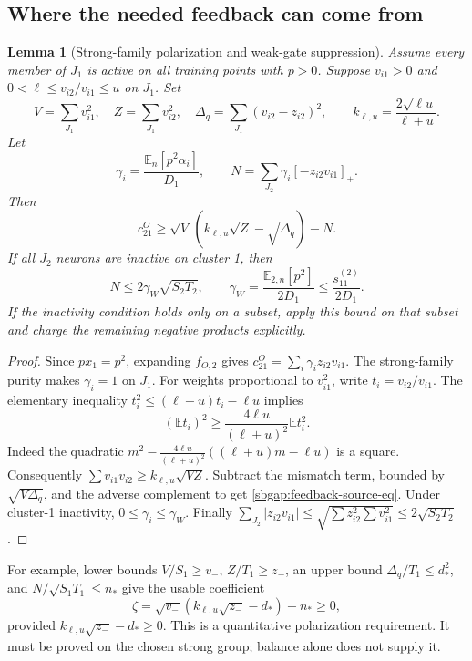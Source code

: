 \documentclass{article} %
\theoremstyle{plain}
\newtheorem{lemma}[theorem]{Lemma}
\theoremstyle{definition}
\theoremstyle{remark}
\begin{document}
\subsection{Where the needed feedback can come from}

\begin{lemma}[Strong-family polarization and weak-gate suppression]
\label{sbgap:feedback-source}
Assume every member of $J_1$ is active on all training points with $p>0$.
Suppose $v_{i1}>0$ and
$0<\ell\le v_{i2}/v_{i1}\le u$ on $J_1$. Set
\[
 V=\sum_{J_1}v_{i1}^2,\quad Z=\sum_{J_1}v_{i2}^2,\quad
 \Delta_q=\sum_{J_1}(v_{i2}-z_{i2})^2,\qquad
 k_{\ell,u}=\frac{2\sqrt{\ell u}}{\ell+u}.
\]
Let
\[
 \gamma_i=\frac{\mathbb E_n[p^2\alpha_i]}{D_1},\qquad
 N=\sum_{J_2}\gamma_i[-z_{i2}v_{i1}]_+.
\]
Then
\begin{equation}\label{sbgap:feedback-source-eq}
 c_{21}^O\ge \sqrt V\,(k_{\ell,u}\sqrt Z-\sqrt{\Delta_q})-N.
\end{equation}
If all $J_2$ neurons are inactive on cluster 1, then
\begin{equation}\label{sbgap:weak-suppression}
 N\le 2\gamma_W\sqrt{S_2T_2},\qquad
 \gamma_W=\frac{\mathbb E_{2,n}[p^2]}{2D_1}
       \le\frac{s_{11}^{(2)}}{2D_1}.
\end{equation}
If the inactivity condition holds only on a subset, apply this bound on
that subset and charge the remaining negative products explicitly.
\end{lemma}
\begin{proof}
Since $p x_1=p^2$, expanding $f_{O,2}$ gives
$c_{21}^O=\sum_i\gamma_i z_{i2}v_{i1}$.
The strong-family purity makes $\gamma_i=1$ on $J_1$.
For weights proportional to $v_{i1}^2$, write $t_i=v_{i2}/v_{i1}$.
The elementary inequality
$t_i^2\le(\ell+u)t_i-\ell u$ implies
\[
 (\mathbb E t_i)^2\ge
       \frac{4\ell u}{(\ell+u)^2}\mathbb E t_i^2.
\]
Indeed the quadratic
$m^2-\frac{4\ell u}{(\ell+u)^2}((\ell+u)m-\ell u)$ is a square.
Consequently $\sum v_{i1}v_{i2}\ge k_{\ell,u}\sqrt{VZ}$.
Subtract the mismatch term, bounded by $\sqrt{V\Delta_q}$, and the
adverse complement to get \eqref{sbgap:feedback-source-eq}.
Under cluster-1 inactivity, $0\le\gamma_i\le\gamma_W$.
Finally
$\sum_{J_2}|z_{i2}v_{i1}|
\le\sqrt{\sum z_{i2}^2\sum v_{i1}^2}\le2\sqrt{S_2T_2}$.
\end{proof}

For example, lower bounds $V/S_1\ge v_-$, $Z/T_1\ge z_-$,
an upper bound $\Delta_q/T_1\le d_*^2$, and
$N/\sqrt{S_1T_1}\le n_*$ give the usable coefficient
\[
 \zeta=\sqrt{v_-}(k_{\ell,u}\sqrt{z_-}-d_*)-n_*\ge0,
\]
provided $k_{\ell,u}\sqrt{z_-}-d_*\ge0$.
This is a quantitative polarization requirement. It must be proved on the
chosen strong group; balance alone does not supply it.
\end{document}
